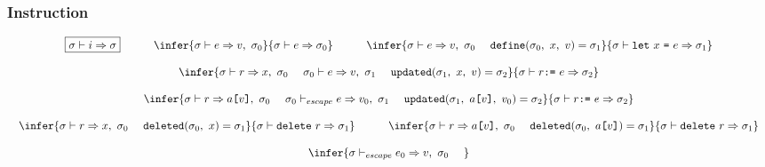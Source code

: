 \documentclass[11pt]{article}
\newcommand{\Term}[1]{\texttt{#1}}
\newcommand{\cs}[0]{\quad}
\newcommand{\symstate}[0]{\sigma}
\newcommand{\evalinst}[3]{#1 \vdash #2 \Rightarrow #3}
\newcommand{\evalexpr}[4]{#1 \vdash #2 \Rightarrow #3,\ #4}
\newcommand{\evalescexpr}[4]{#1 \vdash_{escape} #2 \Rightarrow #3,\ #4}
\newcommand{\evalref}[4]{#1 \vdash #2 \Rightarrow #3,\ #4}
\newcommand{\hdefine}[4]{\Term{define}(#1,\ #2,\ #3) = #4}
\newcommand{\hupdated}[4]{\Term{updated}(#1,\ #2,\ #3) = #4}
\newcommand{\hdeleted}[3]{\Term{deleted}(#1,\ #2) = #3}
\begin{document}
\newpage

\subsubsection{Instruction}

\[
\begin{array}{c}
\multicolumn{1}{c}{\begin{array}{ccccc}
\fbox{$\evalinst{\symstate}{i}{\symstate}$}
&
\cs
&
\infer
{ \evalexpr{\symstate}{e}{v}{\symstate_0} }
{ \evalinst{\symstate}{e}{\symstate_0} }
&
\cs
&
\infer
{ \evalexpr{\symstate}{e}{v}{\symstate_0}\ \ \ \
\hdefine{\symstate_0}{x}{v}{\symstate_1}}
{ \evalinst{\symstate}{\Term{let}\ x\ \Term{=}\ e}{\symstate_1} }
\end{array}}
\\ \\
\infer
{ \evalref{\symstate}{r}{x}{\symstate_0}\ \ \ \
\evalexpr{\symstate_0}{e}{v}{\symstate_1}\ \ \ \
\hupdated{\symstate_1}{x}{v}{\symstate_2}}
{ \evalinst{\symstate}{r \Term{:=}\ e}{\symstate_2} }
\\ \\
\infer
{ \evalref{\symstate}{r}{a\Term{[} v \Term{]}}{\symstate_0}\ \ \ \
\evalescexpr{\symstate_0}{e}{v_0}{\symstate_1}\ \ \ \
\hupdated{\symstate_1}{a\Term{[} v \Term{]}}{v_0}{\symstate_2}}
{ \evalinst{\symstate}{r \Term{:=}\ e}{\symstate_2} }
\\ \\
\multicolumn{1}{c}{\begin{array}{ccc}
\infer
{ \evalref{\symstate}{r}{x}{\symstate_0}\ \ \ \
\hdeleted{\symstate_0}{x}{\symstate_1}}
{ \evalinst{\symstate}{\Term{delete}\ r}{\symstate_1} }
& \cs &
\infer
{ \evalref{\symstate}{r}{a\Term{[} v \Term{]}}{\symstate_0}\ \ \ \
\hdeleted{\symstate_0}{a\Term{[} v \Term{]}}{\symstate_1}}
{ \evalinst{\symstate}{\Term{delete}\ r}{\symstate_1} }
\end{array}}
\\ \\
\infer
{ \evalescexpr{\symstate}{e_0}{v}{\symstate_0}\ \ \ \
}
\end{array}\]
\end{document}
